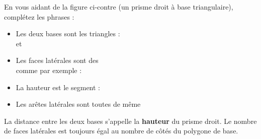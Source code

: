 \documentclass[a4paper]{book}
\begin{document}
    \noindent
    \begin{minipage}{0.55\textwidth}
        \begin{exemple}
        En vous aidant de la figure ci-contre (un prisme droit à base triangulaire), complétez les phrases :
        \begin{itemize}
            \item Les deux bases sont les triangles : \\
            \points[5] et \points[5]
            \item Les faces latérales sont des \points[5] \\
            comme par exemple : \points[8]
            \item La hauteur est le segment : \points[6]
            \item Les arêtes latérales sont toutes de même \points[6]
        \end{itemize}
        \end{exemple}
    \end{minipage}
    \hfill
    \begin{minipage}{0.4\textwidth}
    \centering
    \end{minipage}

    \begin{remarque}
        La distance entre les deux bases s'appelle la \textbf{hauteur} du prisme droit. Le nombre de faces latérales est toujours égal au nombre de côtés du polygone de base.
    \end{remarque}
\end{document}

